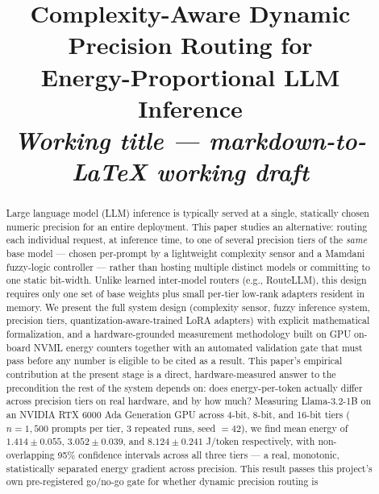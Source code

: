 \documentclass[conference]{IEEEtran}
\begin{document}
\title{Complexity-Aware Dynamic Precision Routing for\\Energy-Proportional LLM Inference\\
\large\textit{Working title --- markdown-to-LaTeX working draft}}

\author{
}

\maketitle

\begin{abstract}
Large language model (LLM) inference is typically served at a single,
statically chosen numeric precision for an entire deployment. This paper
studies an alternative: routing each individual request, at inference
time, to one of several precision tiers of the \emph{same} base model ---
chosen per-prompt by a lightweight complexity sensor and a Mamdani
fuzzy-logic controller --- rather than hosting multiple distinct models or
committing to one static bit-width. Unlike learned inter-model routers
(e.g., RouteLLM), this design requires only one set of base weights plus
small per-tier low-rank adapters resident in memory. We present the full
system design (complexity sensor, fuzzy inference system, precision tiers,
quantization-aware-trained LoRA adapters) with explicit mathematical
formalization, and a hardware-grounded measurement methodology built on
GPU on-board NVML energy counters together with an automated validation
gate that must pass before any number is eligible to be cited as a result.
This paper's empirical contribution at the present stage is a direct,
hardware-measured answer to the precondition the rest of the system
depends on: does energy-per-token actually differ across precision tiers
on real hardware, and by how much? Measuring Llama-3.2-1B on an NVIDIA RTX
6000 Ada Generation GPU across 4-bit, 8-bit, and 16-bit tiers
($n=1{,}500$ prompts per tier, 3 repeated runs, seed $=42$), we find mean
energy of $1.414\pm0.055$, $3.052\pm0.039$, and $8.124\pm0.241$ J/token
respectively, with non-overlapping 95\% confidence intervals across all
three tiers --- a real, monotonic, statistically separated energy
gradient across precision. This result passes this project's own
pre-registered go/no-go gate for whether dynamic precision routing is

\end{abstract}
\end{document}
